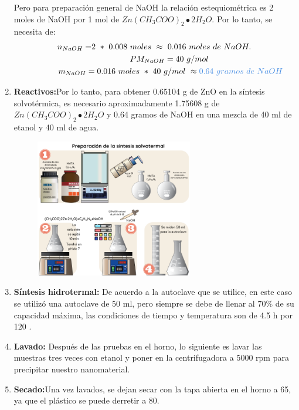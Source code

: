\documentclass[12pt]{article}
\begin{document}
\begin{enumerate}
         
         Pero para preparación general de NaOH la relación estequiométrica es 2 moles de NaOH por 1 mol de $\displaystyle Zn( CH_{3} COO)_{2} \smblkcircle 2H_{2} O$. Por lo tanto, se necesita de:  
            \begin{gather}
            {\displaystyle n_{NaOH} =} 2\ *\ 0.008\ moles\ \approx \ 0.016\ moles\ de\ NaOH.\\
            \ \ \ \ \ \ \ \ \ \ \ \ {\displaystyle PM_{NaOH} =40\ g/mol} \ \\
            \ \ \ \ \ \ \ \ \ \ \ \ {\displaystyle m_{NaOH}} =0.016\ moles\ *\ 40\ g/mol\ \approx \textcolor[rgb]{0.29,0.56,0.89}{0.64\ gramos\ de\ NaOH}
            \end{gather}
        \item\textbf{Reactivos:}Por lo tanto, para obtener 0.65104 g de ZnO en la síntesis solvotérmica, es necesario aproximadamente 1.75608 g de $\displaystyle Zn( CH_{3} COO)_{2} \smblkcircle 2H_{2} O$ y 0.64 gramos de NaOH en una mezcla de 40 ml de etanol y 40 ml de agua.
        
        \begin{figure}[H]
        	\begin{center}
         		\includegraphics[width = 0.65\textwidth]{Imagenes/SÍntesis ZnO_1.png}
        	\end{center} 
        \end{figure}

        \item\textbf{Síntesis hidrotermal:} De acuerdo a la autoclave que se utilice, en este caso se utilizó una autoclave de 50 ml, pero siempre se debe de llenar al 70\% de su capacidad máxima, las condiciones de tiempo y temperatura son de 4.5 h por 120 .
        
        \item\textbf{Lavado:}  Después de las pruebas en el horno, lo siguiente es lavar las muestras tres veces con etanol y poner en la centrifugadora a 5000 rpm para precipitar nuestro nanomaterial.
        
        \item\textbf{Secado:}Una vez lavados, se dejan secar con la tapa abierta en el horno a 65, ya que el plástico se puede derretir a 80. 
        
         \end{enumerate}
        
\end{document}
